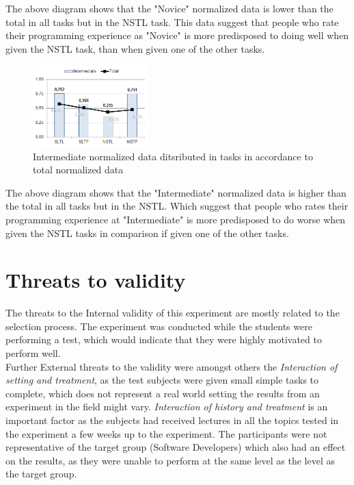 \documentclass{sig-alternate-05-2015}
\begin{document}
The above diagram shows that the "Novice" normalized data is lower than the total in all tasks but in the NSTL task. This data suggest that people who rate their programming experience as "Novice" is more predisposed to doing well when given the NSTL task, than when given one of the other tasks.

\begin{figure}[H]
	\centering
	\includegraphics[width=0.4\textwidth]{img12}
	\caption{Intermediate normalized data ditsributed in tasks in accordance to total normalized data}
\end{figure}

The above diagram shows that the "Intermediate" normalized data is higher than the total in all tasks but in the NSTL. Which suggest that people who rates their programming experience at "Intermediate" is more predisposed to do worse when given the NSTL tasks in comparison if given one of the other tasks.

\section{Threats to validity}

The threats to the Internal validity of this experiment are mostly related to the selection process. The experiment was conducted while the students were performing a test, which would indicate that they were highly motivated to perform well.\\

Further External threats to the validity were amongst others the \textit{Interaction of setting and treatment}, as the test subjects were given small simple tasks to complete, which does not represent a real world setting the results from an experiment in the field might vary. \textit{Interaction of history and treatment} is an important factor as the subjects had received lectures in all the topics tested in the experiment a few weeks up to the experiment. The participants were not representative of the target group (Software Developers) which also had an effect on the results, as they were unable to perform at the same level as the level as the target group.\\
\end{document}
